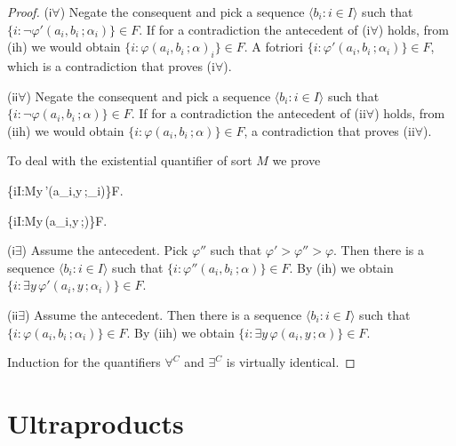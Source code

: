 \documentclass[11pt,oneside]{amsart}
\theoremstyle{plain}
\theoremstyle{remark}
\begin{document}
\begin{proof}
  ($\textsf{i}\forall$) Negate the consequent and pick a sequence $\langle b_i:i\in I\rangle$ such that $\big\{ i:\neg\varphi'(a_i,b_i\,;\alpha_i)\big\}\in F$. 
  If for a contradiction the antecedent of (\textsf{i}$\forall$) holds, from (\textsf{ih}) we would obtain $\big\{i:\varphi(a_i,b_i\,; \alpha)_i\big\}\in F$.
  A fotriori  $\big\{i:\varphi'(a_i,b_i\,; \alpha_i)\big\}\in F$, which is a contradiction that proves (\textsf{i}$\forall$).

  ($\textsf{ii}\forall$) Negate the consequent and pick a sequence $\langle b_i:i\in I\rangle$ such that $\big\{ i:\neg\varphi(a_i,b_i\,;\alpha)\big\}\in F$. 
  If for a contradiction the antecedent of (\textsf{ii}$\forall$) holds, from (\textsf{iih}) we would obtain $\big\{i:\varphi(a_i,b_i\,; \alpha)\big\}\in F$, a contradiction that proves (\textsf{ii}$\forall$).

  To deal with the existential quantifier of sort $M$ we prove 

  {\Rightarrow}
  {\big\{i\in I:{\EuScript M}\models\exists y\,\varphi'(a_i,y\,;\alpha_i)\big\}\in F}.

  {\Rightarrow}
  {\big\{i\in I:{\EuScript M}\models\exists y\,\varphi(a_i,y\,;\alpha)\big\}\in F}.

  ($\textsf{i}\exists$) Assume the antecedent.
  Pick $\varphi''$ such that $\varphi'>\varphi''>\varphi$.
  Then there is a sequence $\langle b_i:i\in I\rangle$ such that $\big\{ i:\varphi''(a_i,b_i\,;\alpha)\big\}\in F$.
  By (\textsf{ih})  we obtain $\big\{ i:\exists y\,\varphi'(a_i,y\,;\alpha_i)\big\}\in F$.
  

  ($\textsf{ii}\exists$) Assume the antecedent.
  Then there is a sequence $\langle b_i:i\in I\rangle$ such that $\big\{ i:\varphi(a_i,b_i\,;\alpha_i)\big\}\in F$.
  By (\textsf{iih}) we obtain $\big\{ i:\exists y\,\varphi(a_i,y\,;\alpha)\big\}\in F$.

  Induction for the quantifiers $\forall^C$ and  $\exists^C$ is virtually identical.
\end{proof}

\section{Ultraproducts}\label{ultrapws}
\end{document}
